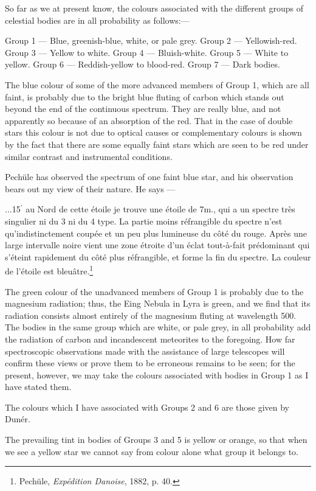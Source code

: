 \documentclass[a4paper, 12pt, oneside, polutonikogreek, english]{article}
\begin{document}
So far as we at present know, the colours associated with the different groups of celestial bodies are in all probability as follows:---

Group 1 --- Blue, greenish-blue, white, or pale grey. 
Group 2 --- Yellowish-red. 
Group 3 --- Yellow to white. 
Group 4 --- Bluish-white. 
Group 5 --- White to yellow. 
Group 6 --- Reddish-yellow to blood-red. 
Group 7 --- Dark bodies.

The blue colour of some of the more advanced members of Group 1, which are all faint, is probably due to the bright blue fluting of carbon which stands out beyond the end of the continuous spectrum. They are really blue, and not apparently so because of an absorption of the red. That in the case of double stars this colour is not due to optical causes or complementary colours is shown by the fact that there are some equally faint stars which are seen to be red under similar contrast and instrumental conditions.

Pechüle has observed the spectrum of one faint blue star, and his observation bears out my view of their nature. He says ---

...15$^{\prime}$ au Nord de cette étoile je trouve une étoile de 7m., qui a un spectre très singulier ni du 3 ni du 4 type. La partie moins réfrangible du spectre n'est qu'indistinctement coupée et un peu plus lumineuse du côté du rouge. Après une large intervalle noire vient une zone étroite d'un éclat tout-à-fait prédominant qui s'éteint rapidement du côté plus réfrangible, et forme la fin du spectre. La couleur de l'étoile est bleuâtre.\footnote{Pechüle, \emph{Expédition Danoise}, 1882, p. 40.}

The green colour of the unadvanced members of Group 1 is probably due to the magnesium radiation; thus, the Eing Nebula in Lyra is green, and we find that its radiation consists almost entirely of the magnesium fluting at wavelength 500. The bodies in the same group which are white, or pale grey, in all probability add the radiation of carbon and incandescent meteorites to the foregoing. How far spectroscopic observations made with the assistance of large telescopes will confirm these views or prove them to be erroneous remains to be seen; for the present, however, we may take the colours associated with bodies in Group 1 as I have stated them.

The colours which I have associated with Groups 2 and 6 are those given by Dunér.

The prevailing tint in bodies of Groups 3 and 5 is yellow or orange, so that when we see a yellow star we cannot say from colour alone what group it belongs to.
\end{document}
